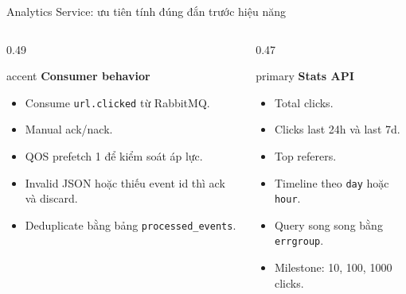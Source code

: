 \documentclass[aspectratio=169]{beamer}
\begin{document}
\begin{frame}{Analytics Service: ưu tiên tính đúng đắn trước hiệu năng}
    \begin{columns}[T,onlytextwidth]
        \begin{column}{0.49\textwidth}
            \begin{claimbox}{accent}
                \textbf{Consumer behavior}
                \begin{itemize}\small
                    \item Consume \texttt{url.clicked} từ RabbitMQ.
                    \item Manual ack/nack.
                    \item QOS prefetch 1 để kiểm soát áp lực.
                    \item Invalid JSON hoặc thiếu event id thì ack và discard.
                    \item Deduplicate bằng bảng \texttt{processed\_events}.
                \end{itemize}
            \end{claimbox}
        \end{column}
        \begin{column}{0.47\textwidth}
            \begin{claimbox}{primary}
                \textbf{Stats API}
                \begin{itemize}\small
                    \item Total clicks.
                    \item Clicks last 24h và last 7d.
                    \item Top referers.
                    \item Timeline theo \texttt{day} hoặc \texttt{hour}.
                    \item Query song song bằng \texttt{errgroup}.
                    \item Milestone: 10, 100, 1000 clicks.
                \end{itemize}
            \end{claimbox}
        \end{column}
    \end{columns}
\end{frame}
\end{document}
